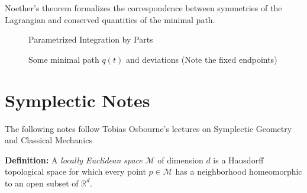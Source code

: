 \documentclass{article}\usepackage[]{graphicx}\usepackage[]{color}
\begin{document}
Noether's theorem formalizes the correspondence between symmetries of the Lagrangian and conserved quantities of the minimal path.








\vspace{7cm}
  \begin{center}
    \begin{figure}
   
 
 \vspace{-1cm}

\caption{Parametrized Integration by Parts}

  
\end{figure}  
   \end{center}


  \begin{center}
  
    \begin{figure}
   
 
 \vspace{-1cm}

\caption{Some minimal path $q(t)$ and deviations (Note the fixed endpoints)}
  \vspace{2pt}
  
\end{figure}  

   \end{center}

\pagebreak

\section{Symplectic Notes}

The following notes follow Tobias Osbourne's lectures on Symplectic Geometry and Classical Mechanics %

\textbf{Definition:} A \textit{locally Euclidean space} $\mathcal{M}$ of dimension $d$ is a Hausdorff topological space for which every point $p\in \mathcal{M}$ has a neighborhood homeomorphic to an open subset of $\mathbb{R}^d$.
\end{document}
